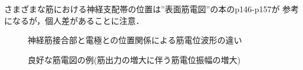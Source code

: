 \documentclass[10pt,twocolumn]{jarticle}
\begin{document}
さまざまな筋における神経支配帯の位置は''表面筋電図''の本のp146-p157が
参考になるが，個人差があることに注意．
\begin{figure}[h]
  \centering
  \caption{神経筋接合部と電極との位置関係による筋電位波形の違い\label{fig:2-9}}
 \end{figure}
\begin{figure}[h]
  \centering
  \caption{良好な筋電図の例(筋出力の増大に伴う筋電位振幅の増大)\label{fig:2-10}}
 \end{figure}
\end{document}
